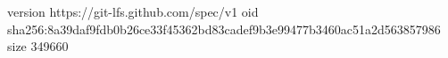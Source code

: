 version https://git-lfs.github.com/spec/v1
oid sha256:8a39daf9fdb0b26ce33f45362bd83cadef9b3e99477b3460ac51a2d563857986
size 349660
